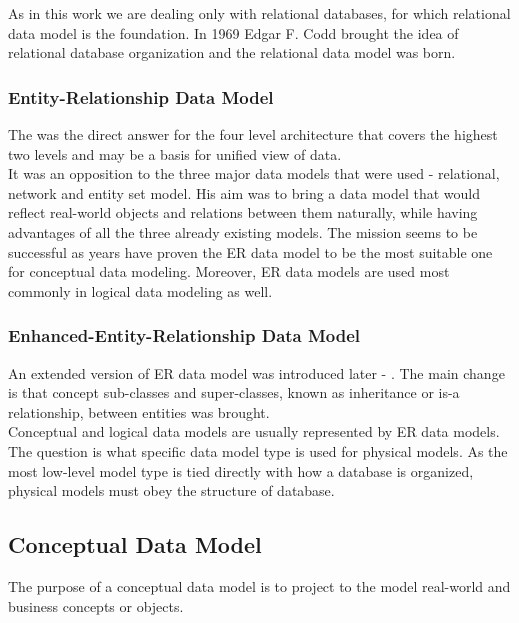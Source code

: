As in this work we are dealing only with relational databases, for which relational data model is the foundation.
In 1969 Edgar F. Codd \cite{Codd69} brought the idea of relational database organization and the relational data model was born. 

\subsubsection{Entity-Relationship Data Model}

The  was the direct answer for the four level architecture\cite{Chen76theentity-relationship} that covers the highest two levels and may be a basis for unified view of data. \\
It was an opposition to the three major data models that were used - relational, network and entity set model. His aim was to bring a data model that would reflect real-world objects and relations between them naturally, while having advantages of all the three already existing models. The mission seems to be successful as years have proven the ER data model to be the most suitable one for conceptual data modeling. Moreover, ER data models are used most commonly in logical data modeling as well.

\subsubsection{Enhanced-Entity-Relationship Data Model}

An extended version of ER data model was introduced later - . The main change is that concept sub-classes and super-classes, known as inheritance or is-a relationship, between entities was brought. \\ 

Conceptual and logical data models are usually represented by ER data models. 
The question is what specific data model type is used for physical models. 
As the most low-level model type is tied directly with how a database is organized, physical models must obey the structure of database.

\subsection{Conceptual Data Model}

The purpose of a conceptual data model is to project to the model real-world and business concepts or objects. \\

